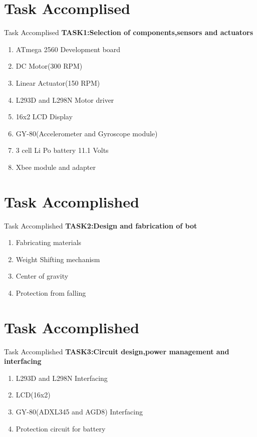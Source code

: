 \documentclass[10pt, a4paper]{beamer}
\begin{document}
\section{Task Accomplised}
\begin{frame}{Task Accomplised}
	\textbf{TASK1:Selection of components,sensors and actuators} 
    \begin{enumerate}
     \item ATmega 2560 Development board
     \item DC Motor(300 RPM)
     \item Linear Actuator(150 RPM)
     \item L293D and L298N Motor driver
     \item 16x2 LCD Display
     \item GY-80(Accelerometer and Gyroscope module)
     \item 3 cell Li Po battery 11.1 Volts
     \item Xbee module and adapter
    \end{enumerate}
\end{frame}

\section{Task Accomplished}
\begin{frame}{Task Accomplished}
	\textbf{TASK2:Design and fabrication of bot}
	\begin{enumerate}
		\item Fabricating materials
		\item Weight Shifting mechanism
		\item Center of gravity
		\item Protection from falling  
	\end{enumerate}
\end{frame}


\section{Task Accomplished}
\begin{frame}{Task Accomplished}
	\textbf{TASK3:Circuit design,power management and interfacing}
	\begin{enumerate}
		\item L293D and L298N Interfacing
		\item LCD(16x2) 
		\item GY-80(ADXL345 and AGD8) Interfacing 
		\item Protection circuit for battery 
	\end{enumerate}
\end{frame}
\end{document}
